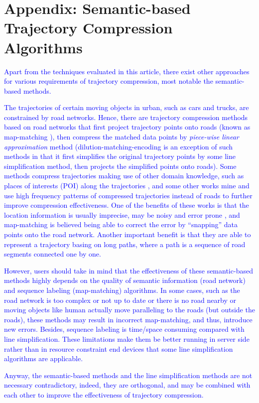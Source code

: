 \section*{{Appendix: Semantic-based Trajectory Compression Algorithms}}
\textcolor{blue}{Apart from the techniques evaluated in this article, there exist other approaches for various requirements of trajectory compression, most notable the semantic-based methods.}

\textcolor{blue}{The trajectories of certain moving objects in urban, such as cars and trucks, are constrained by road networks. Hence, there are trajectory compression methods based on road networks \cite{Chen:Trajectory, Popa:Spatio,Civilis:Techniques,Hung:Clustering, Kellaris:Map, Song:PRESS, Han:Compress, Cao:Road} that first project trajectory points onto roads (known as map-matching \cite{Quddus:MapMatching}), then compress the matched data points by \emph{piece-wise linear approximation} method \cite{Elmeleegy:Stream, Xie:Stream,Luo:Streaming,ORourke:Fitting} (dilution-matching-encoding \cite{Gotsman:Compaction} is an exception of such methods in that it first simplifies the original trajectory points by some line simplification method, then projects the simplified points onto roads).}
%
\textcolor{blue}{Some methods \cite{Schmid:Semantic, Richter:Semantic} compress trajectories making use of other domain knowledge, such as places of interests (POI) along the trajectories \cite{Richter:Semantic}, and some other works \cite{Gotsman:Compaction, Song:PRESS, Han:Compress,Koide:CiNCT} mine and use high frequency patterns of compressed trajectories instead of roads to further improve compression effectiveness.}
%
\textcolor{blue}{One of the benefits of these works is that the location information is usually imprecise, may be noisy and error prone \cite{Cao:Road}, and map-matching is believed being able to correct the error by “snapping” data points onto the road network.
Another important benefit is that they are able to represent a trajectory basing on long paths, where a path is a sequence of road segments connected one by one.}

\textcolor{blue}{However, users should take in mind that the effectiveness of these semantic-based methods highly depends on the quality of semantic information (\eg road network) and sequence labeling (\eg map-matching) algorithms. In some cases, such as the road network is too complex or not up to date or there is no road nearby or moving objects like human actually move paralleling to the roads (but outside the roads), these methods may result in incorrect map-matching, and thus, introduce new errors.}
\textcolor{blue}{Besides, sequence labeling is time/space consuming compared with line simplification. These limitations make them be better running in server side rather than in resource constraint end devices that some line simplification algorithms are applicable.}

\textcolor{blue}{Anyway, the semantic-based methods and the line simplification methods are not necessary contradictory, indeed, they are orthogonal, and may be combined with each other to improve the effectiveness of trajectory compression.}



